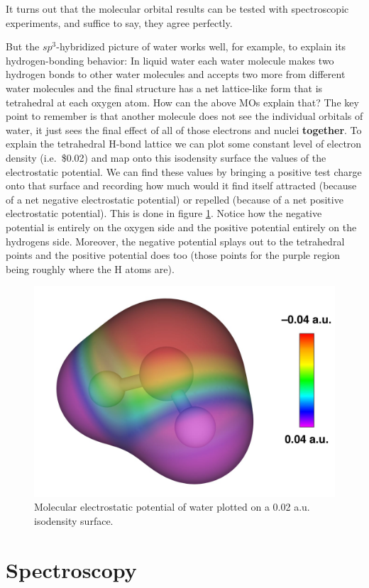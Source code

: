 \documentclass[
  9pt,
]{extbook}
\theoremstyle{definition}
\theoremstyle{definition}
\theoremstyle{definition}
\theoremstyle{remark}
\begin{document}
It turns out that the molecular orbital results can be tested with spectroscopic experiments, and suffice to say, they agree perfectly.

But the \(sp^3\)-hybridized picture of water works well, for example, to explain its hydrogen-bonding behavior: In liquid water each water molecule makes two hydrogen bonds to other water molecules and accepts two more from different water molecules and the final structure has a net lattice-like form that is tetrahedral at each oxygen atom. How can the above MOs explain that? The key point to remember is that another molecule does not see the individual orbitals of water, it just sees the final effect of all of those electrons and nuclei \textbf{together}. To explain the tetrahedral H-bond lattice we can plot some constant level of electron density (i.e.~\$0.02) and map onto this isodensity surface the values of the electrostatic potential. We can find these values by bringing a positive test charge onto that surface and recording how much would it find itself attracted (because of a net negative electrostatic potential) or repelled (because of a net positive electrostatic potential). This is done in figure \ref{fig:Fig2c12b}. Notice how the negative potential is entirely on the oxygen side and the positive potential entirely on the hydrogens side. Moreover, the negative potential splays out to the tetrahedral points and the positive potential does too (those points for the purple region being roughly where the H atoms are).

\begin{figure}

{\centering \includegraphics[width=0.6\linewidth]{./img/Fig13_map} 

}

\caption{Molecular electrostatic potential of water plotted on a 0.02 a.u. isodensity surface.}\label{fig:Fig2c12b}
\end{figure}

\hypertarget{Spectroscopy}{%
\chapter{Spectroscopy}\label{Spectroscopy}}
\end{document}
